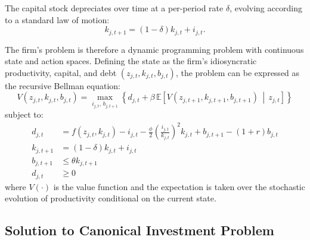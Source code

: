 The capital stock depreciates over time at a per-period rate $\delta$, evolving
according to a standard law of motion:
\begin{equation}
    k_{j,t+1} = (1 - \delta) k_{j,t} + i_{j,t}.
\end{equation}

The firm's problem is therefore a dynamic programming problem with continuous
state and action spaces. Defining the state as the firm's idiosyncratic
productivity, capital, and debt $(z_{j,t}, k_{j,t}, b_{j,t})$, the problem can
be expressed as the recursive Bellman equation:
\begin{equation}
    V(z_{j,t}, k_{j,t}, b_{j,t}) =
    \max_{i_{j,t},\, b_{j,t+1}} \left\{
    d_{j,t} + \beta \, \mathbb{E}\!\left[
    V(z_{j,t+1}, k_{j,t+1}, b_{j,t+1})
    \,\middle|\, z_{j,t} \right] \right\}
\end{equation}
subject to:
\begin{align}
    d_{j,t} &= f(z_{j,t}, k_{j,t}) - i_{j,t}
    - \frac{\phi}{2} \left(\frac{i_{j,t}}{k_{j,t}}\right)^2 k_{j,t}
    + b_{j,t+1} - (1+r)b_{j,t} \\
    k_{j,t+1} &= (1 - \delta) k_{j,t} + i_{j,t} \\
    b_{j,t+1} &\leq \theta k_{j,t+1} \\
    d_{j,t} &\geq 0
\end{align}
where $V(\cdot)$ is the value function and the expectation is taken over the
stochastic evolution of productivity conditional on the current state.

\subsection{Solution to Canonical Investment Problem} \label{subsec:canonical-investment-solution}

